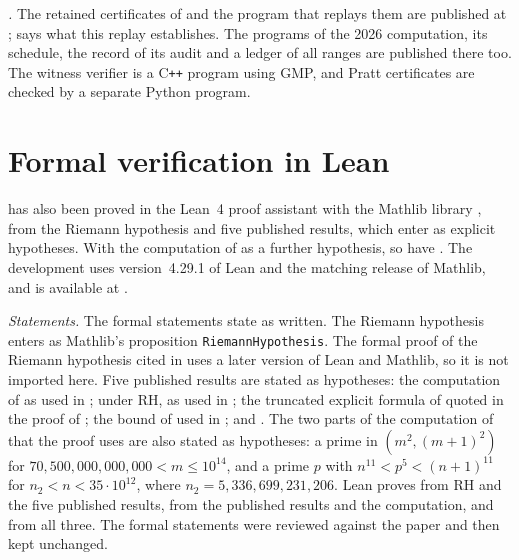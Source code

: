 \documentclass[11pt,colorlinks]{charlie}
\begin{document}
\emph{.} The retained certificates of  and the program that replays them are published at \coderepo;  says what this replay establishes. The programs of the 2026 computation, its schedule, the record of its audit and a ledger of all ranges are published there too. The witness verifier is a C\texttt{++} program using GMP, and Pratt certificates are checked by a separate Python program.

\section{Formal verification in Lean}\label{app:lean}
 has also been proved in the Lean~4 proof assistant \cite{Lean4} with the Mathlib library \cite{Mathlib}, from the Riemann hypothesis and five published results, which enter as explicit hypotheses. With the computation of  as a further hypothesis, so have . The development uses version~4.29.1 of Lean and the matching release of Mathlib, and is available at \coderepo.

\emph{Statements.} The formal statements state  as written. The Riemann hypothesis enters as Mathlib's proposition \texttt{RiemannHypothesis}. The formal proof of the Riemann hypothesis cited in \cite{Alpoge} uses a later version of Lean and Mathlib, so it is not imported here. Five published results are stated as hypotheses: the computation of \cite{SW} as used in ; \cite[Theorem~5]{CMS} under RH, as used in ; the truncated explicit formula of \cite[Ch.~17]{Davenport} quoted in the proof of ; the bound of \cite[Cor.~1]{Trudgian} used in ; and \cite[Thm.~2]{MV}. The two parts of the computation of  that the proof uses are also stated as hypotheses: a prime in $(m^2,(m+1)^2)$ for $70{,}500{,}000{,}000{,}000<m\le10^{14}$, and a prime $p$ with $n^{11}<p^5<(n+1)^{11}$ for $n_2<n<35\cdot10^{12}$, where $n_2=5{,}336{,}699{,}231{,}206$. Lean proves  from RH and the five published results,  from the published results and the computation, and  from all three. The formal statements were reviewed against the paper and then kept unchanged.
\end{document}
